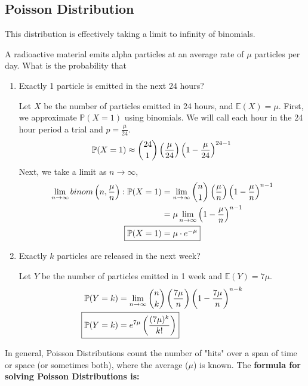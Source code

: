 \documentclass[titlepage, 12pt, leqno]{article}
\begin{document}
\pagebreak
\subsection{Poisson Distribution}
This distribution is effectively taking a limit to infinity of binomials.
\begin{ex}
    A radioactive material emits alpha particles at an average rate of $\mu$
    particles per day. What is the probability that
    \begin{enumerate}
        \item Exactly 1 particle is emitted in the next 24 hours?
            \vspace{10px}
            
            Let $X$ be the number of particles emitted in 24 hours, and 
            $ \mathbb{E}(X) = \mu$. First, we approximate $\mathbb{P}(X=1)$ using
            binomials. We will call each hour in the 24 hour period a trial and
            $p = \frac{\mu}{24}$.
            \[
               \mathbb{P}(X=1) \approx \binom{24}{1}\left(\frac{\mu}{24}\right)
               \left(1 - \frac{\mu}{24}\right)^{24-1} \\
            \]
            Next, we take a limit as $n \to \infty$,
           \begin{align*}
               \lim_{n \to \infty} binom\left(n,\frac{\mu}{n}\right) : 
               \mathbb{P}(X=1) &= \lim_{n \to \infty} \binom{n}{1}\left(
               \frac{\mu}{n}\right)\left(1-\frac{\mu}{n}\right)^{n-1} \\
                               &= \mu\lim_{n \to \infty} \left(1-
                               \frac{\mu}{n}\right)^{n-1} \\
                   \Aboxed{\mathbb{P}(X=1) &= \mu \cdot e^{-\mu}}
           \end{align*}
        \item Exactly $k$ particles are released in the next week?
            \vspace{10px}
            
            Let $Y$ be the number of particles emitted in 1 week and $ \mathbb{E}
            (Y) = 7\mu$.
           \begin{align*}
               \mathbb{P}(Y=k) &= \lim_{n \to \infty} \binom{n}{k}\left(
           \frac{7\mu}{n}\right)\left(1-\frac{7\mu}{n}\right)^{n-k} \\
                   \Aboxed{\mathbb{P}(Y=k) &= e^{7\mu} \left(
                   \frac{(7\mu)^k}{k!}\right)}
           \end{align*}
    \end{enumerate}
\end{ex}
In general, Poisson Distributions count the number of "hits" over a span of time
or space (or sometimes both), where the average ($\mu$) is known. The
\textbf{formula for solving Poisson Distributions is:}
\end{document}
